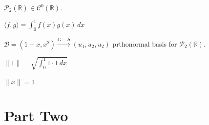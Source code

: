 \documentclass[11pt,fleqn]{book} %
\begin{document}
\begin{example}
    $\mathcal{P}_2(\mathbb{R}) \in \mathcal{C}^0(\mathbb{R})$. 

    $\langle f, g \rangle = \int_0^1 f(x)g(x)\,dx$

    $\mathcal{B} = (1 + x, x^2) \overset{G-S}{\longrightarrow} (u_1, u_2, u_2)$ prthonormal basis for $\mathcal{P}_2(\mathbb{R})$. 

    $\|1\| = \sqrt{\int_0^1 1\cdot1\,dx}$

    $\|x\| = 1$
\end{example}


\part{Part Two}






\end{document}
